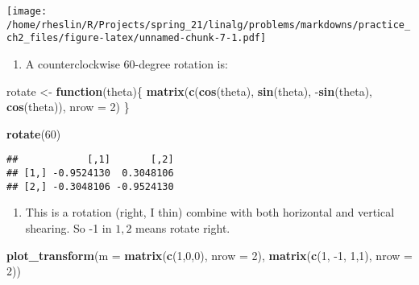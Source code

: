 \documentclass[]{article}
\newenvironment{Shaded}{\begin{snugshade}}{\end{snugshade}}
\newcommand{\ControlFlowTok}[1]{\textcolor[rgb]{0.12,0.11,0.11}{\textbf{#1}}}
\newcommand{\DataTypeTok}[1]{\textcolor[rgb]{0.00,0.34,0.68}{#1}}
\newcommand{\DecValTok}[1]{\textcolor[rgb]{0.69,0.50,0.00}{#1}}
\newcommand{\KeywordTok}[1]{\textcolor[rgb]{0.12,0.11,0.11}{\textbf{#1}}}
\newcommand{\NormalTok}[1]{\textcolor[rgb]{0.12,0.11,0.11}{#1}}
\newcommand{\OperatorTok}[1]{\textcolor[rgb]{0.12,0.11,0.11}{#1}}
\newcommand{\StringTok}[1]{\textcolor[rgb]{0.75,0.01,0.01}{#1}}
\providecommand{\tightlist}{%
  \setlength{\itemsep}{0pt}\setlength{\parskip}{0pt}}
\begin{document}
\texttt{[image: /home/rheslin/R/Projects/spring\_21/linalg/problems/markdowns/practice\_ch2\_files/figure-latex/unnamed-chunk-7-1.pdf]}

\begin{enumerate}
\def\labelenumi{\arabic{enumi}.}
\setcounter{enumi}{1}
\tightlist
\item
  A counterclockwise 60-degree rotation is:
\end{enumerate}

\begin{Shaded}
\begin{Highlighting}[]
\NormalTok{rotate <-}\StringTok{ }\ControlFlowTok{function}\NormalTok{(theta)\{}
  \KeywordTok{matrix}\NormalTok{(}\KeywordTok{c}\NormalTok{(}\KeywordTok{cos}\NormalTok{(theta), }\KeywordTok{sin}\NormalTok{(theta), }\OperatorTok{-}\KeywordTok{sin}\NormalTok{(theta), }\KeywordTok{cos}\NormalTok{(theta)), }\DataTypeTok{nrow =} \DecValTok{2}\NormalTok{)}
\NormalTok{\}}

\KeywordTok{rotate}\NormalTok{(}\DecValTok{60}\NormalTok{)}
\end{Highlighting}
\end{Shaded}

\begin{verbatim}
##            [,1]       [,2]
## [1,] -0.9524130  0.3048106
## [2,] -0.3048106 -0.9524130
\end{verbatim}

\begin{enumerate}
\def\labelenumi{\arabic{enumi}.}
\setcounter{enumi}{3}
\tightlist
\item
  This is a rotation (right, I thin) combine with both horizontal and
  vertical shearing. So -1 in \(1,2\) means rotate right.
\end{enumerate}

\begin{Shaded}
\begin{Highlighting}[]
\KeywordTok{plot_transform}\NormalTok{(}\DataTypeTok{m =} \KeywordTok{matrix}\NormalTok{(}\KeywordTok{c}\NormalTok{(}\DecValTok{1}\NormalTok{,}\DecValTok{0}\NormalTok{,}\DecValTok{0}\NormalTok{), }\DataTypeTok{nrow =} \DecValTok{2}\NormalTok{),}
               \KeywordTok{matrix}\NormalTok{(}\KeywordTok{c}\NormalTok{(}\DecValTok{1}\NormalTok{, }\DecValTok{-1}\NormalTok{, }\DecValTok{1}\NormalTok{,}\DecValTok{1}\NormalTok{), }\DataTypeTok{nrow =} \DecValTok{2}\NormalTok{))}
\end{Highlighting}
\end{Shaded}
\end{document}
